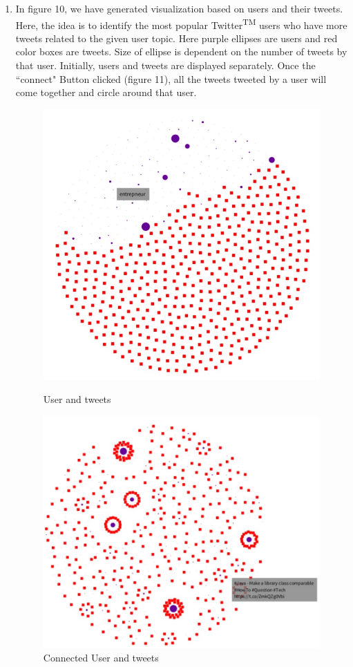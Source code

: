 \documentclass[11pt]{article}
\begin{document}
\begin{enumerate}
\item In figure 10, we have generated visualization based on users and their tweets. Here, the idea is to identify the most popular Twitter\textsuperscript{TM} users who have more tweets related to the given user topic. Here purple ellipses are users and red color boxes are tweets. Size of ellipse is dependent on the number of tweets by that user. Initially, users and tweets are displayed separately. Once the ``connect" Button clicked (figure 11), all the tweets tweeted by a user will come together and circle around that user.
\begin{figure}
\centering
\begin{minipage}{.5\textwidth}
\centering
\includegraphics[width=.8\linewidth]{UserTweet1.jpg}
  \caption{User and tweets}
\end{minipage}%
\begin{minipage}{.5\textwidth}
\centering
\includegraphics[width=.8\linewidth]{UserTweet2.jpg}
  \caption{Connected User and tweets}
\end{minipage}
\end{figure}


\end{enumerate}
\end{document}

